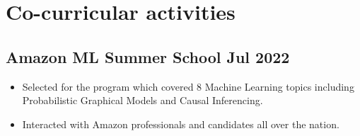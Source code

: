 \documentclass[10pt]{article}
\newenvironment{zitemize}{
\begin{itemize}\itemsep2pt \parskip0pt \parsep1pt}
{\end{itemize}\vspace{-0.7cm}}
\begin{document}






\section{Co-curricular activities }
\vspace{2pt}
\subsection*{Amazon ML Summer School \hfill Jul 2022} 
    \begin{zitemize}
            \item Selected for the program which covered 8 Machine Learning topics including Probabilistic Graphical Models \newline and Causal Inferencing.
            \item Interacted with Amazon professionals and candidates all over the nation.
    \end{zitemize}
    \vspace{0.1cm}
\end{document}
